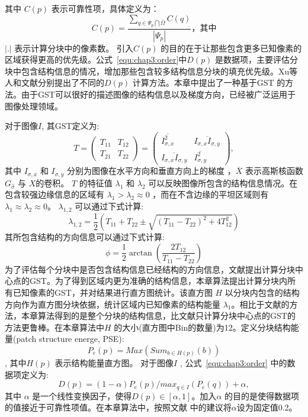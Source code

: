 其中 \(C(p)\) 表示可靠性项\cite{Criminisi04regionfilling}，具体定义为： $$C(p)=\frac{\sum_{q\in\Psi_p\bigcap\overline{\Omega}}{C(q)}}{\left\vert{\Psi_p}\right\vert}，其中$$\(\left\vert.\right\vert\)  表示计算分块中的像素数。 引入\(C(p)\) 的目的在于让那些包含更多已知像素的区域获得更高的优先级。公式~\ref{equ:chap3:order}中\(D(p)\) 是数据项，主要评估分块中包含结构信息的情况，增加那些包含较多结构信息分块的填充优先级。Xu等人\cite{Xu:2010}和文献分别提出了不同的\(D(p)\) 计算方法。本章中提出了一种基于GST 的方法。由于GST可以很好的描述图像的结构信息以及梯度方向，已经被广泛运用于图像处理领域\cite{Kothe03edgeand}。 \par
  对于图像\(I\), 其GST定义为:
  $$T=\left(\begin{array}{cc}T_{11} & T_{12} \\ T_{21} &T_{22}\end{array}\right)=\left(\begin{array}{cc}\overline{I_{\sigma,x}^2} & \overline{I_{\sigma,x}I_{\sigma,y}} \\ \overline{I_{\sigma,x}I_{\sigma,y}} & \overline{I_{\sigma,y}^2}\end{array}\right),$$
  其中 \(I_{\sigma,x}\) 和 \(I_{\sigma,y}\) 分别为图像在水平方向和垂直方向上的梯度 ，\(\overline{X}\) 表示高斯核函数\(G_{\hat{\sigma}}\) 与 \(X\)的卷积。 \(T\) 的特征值 \(\lambda_1\) 和 \(\lambda_2\) 可以反映图像所包含的结构信息情况。在包含较强边缘信息的区域有 \(\lambda_1>\lambda_2\approx0\) ，而在不含边缘的平坦区域则有\(\lambda_1\approx\lambda_2\approx0\)。 \( \lambda_{1,2} \) 可以通过下式计算: $$\lambda_{1,2}=\frac{1}{2}\left(T_{11}+T_{22}\pm\sqrt{\left(T_{11}-T_{22}\right)^2+4T^2_{12}}\right)$$
  其所包含结构的方向信息可以通过下式计算:
 $$\phi=\frac{1}{2}\arctan{\left(\frac{2T_{12}}{T_{11}-T_{22}}\right)}$$
 为了评估每个分块中是否包含结构信息已经结构的方向信息，文献提出计算分块中心点的GST。为了得到区域内更为准确的结构信息，本章算法提出计算分块内所有已知像素的GST，并对结果进行直方图统计。该直方图 \(H\) 以分块内包含的结构方向作为直方图分块依据，统计区域内已知像素的结构能量 \(\lambda_1\)。相比于文献的方法，本章算法得到的是整个分块的结构信息，比文献只计算分块中心点的GST的方法更鲁棒。在本章算法中\(H\) 的大小(直方图中Bin的数量)为12。定义分块结构能量(patch structure energe, PSE):
 $$P_e\left(p\right)=Max\left(Sum_{b\in{H\left(p\right)}}\left(b\right)\right)$$, 其中\(H\left(p\right)\) 表示结构能量直方图。 对于图像\(I\) , 公式~\ref{equ:chap3:order} 中的数据项定义为:
 $$D(p)=(1-\alpha)P_e(p)/max_{q\in{I}}(P_e(q))+\alpha,$$ 其中 \(\alpha\) 是一个线性变换因子，使得\(D(p)\in{[\alpha,1]}\)。加入\(\alpha\) 的目的是使得数据项的值接近于可靠性项值。在本章算法中，按照文献 中的建议将\(\alpha\)设为固定值0.2。
